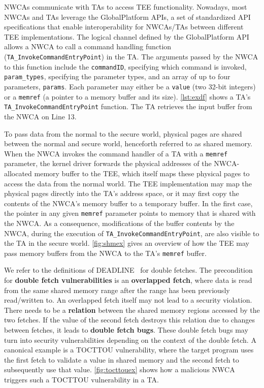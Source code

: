\documentclass[conference]{IEEEtran}
\begin{document}
NWCAs communicate with TAs to access TEE functionality. Nowadays, most NWCAs and TAs 
leverage the GlobalPlatform APIs, a set of standardized API specifications that enable 
interoperability for NWCAs/TAs between different TEE implementations. The logical 
channel defined by the GlobalPlatform API allows a NWCA to call a command handling 
function (\texttt{TA\_InvokeCommandEntryPoint}) in the TA.  
The arguments passed by the NWCA to this function include the \texttt{commandID}, specifying 
which command is invoked, \texttt{param\_types}, specifying the parameter types, 
and an array of up to four parameters, \texttt{params}. 
Each parameter may either be a \texttt{value} (two 32-bit integers) or a 
\texttt{memref} (a pointer to a memory buffer and its size). 
\autoref{lst:exdf} shows a TA's \texttt{TA\_InvokeCommandEntryPoint} function.
The TA retrieves the input buffer from the NWCA on Line 13.

To pass data from the normal to the secure world, physical pages are shared 
between the normal and secure world, henceforth referred to as shared memory. 
When the NWCA invokes the command handler of a TA with a \texttt{memref} 
parameter, the kernel driver forwards the physical addresses of the NWCA-allocated 
memory buffer to the TEE, which itself maps these physical pages to access the data 
from the normal world. The TEE implementation may map 
the physical pages directly into the TA's address space, or it may first copy
the contents of the NWCA's memory buffer to a temporary buffer. In the first case, the 
pointer in any given \texttt{memref} parameter points to memory that is shared 
with the NWCA. As a consequence, modifications of the buffer contents by the NWCA, 
during the execution of \texttt{TA\_InvokeCommandEntryPoint}, are also visible to the 
TA in the secure world. \autoref{fig:shmex} gives an overview of how the TEE may pass 
memory buffers from the NWCA to the TA's \texttt{memref} buffer.

We refer to the definitions of \textsc{DEADLINE}~\cite{deadline} for double fetches.
The precondition for \textbf{double fetch vulnerabilities} is an \textbf{overlapped fetch}, where data 
is read from the same shared memory range after the range has been previously read/written to. 
An overlapped fetch itself may not lead to a security violation. There needs to be a \textbf{relation}
between the shared memory regions accessed by the two fetches. If the value of the second fetch 
destroys this relation due to changes between fetches, it leads to \textbf{double fetch bugs}.  
These double fetch bugs may turn into security vulnerabilities depending on the context of the 
double fetch. A canonical example is a TOCTTOU vulnerability, where the target program uses the 
first fetch to validate a value in shared memory and the second fetch to subsequently use that value. 
\autoref{fig:tocttouex} shows how a malicious NWCA triggers such a TOCTTOU vulnerability in a TA. 
\end{document}

